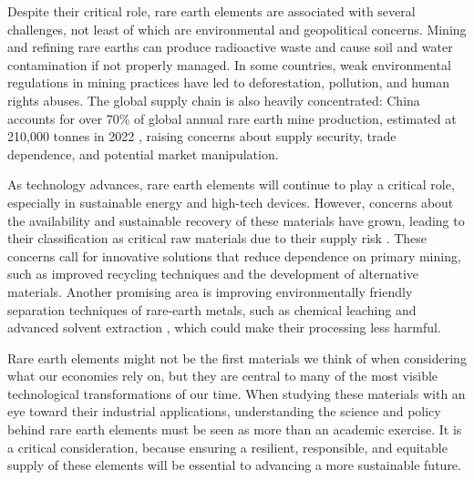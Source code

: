 \documentclass[letterpaper,10pt]{article}
\begin{document}
\newline  
\par
Despite their critical role, rare earth elements are associated with several challenges, not least of which are environmental and geopolitical concerns. Mining and refining rare earths can produce radioactive waste and cause soil and water contamination if not properly managed. In some countries, weak environmental regulations in mining practices have led to deforestation, pollution, and human rights abuses. The global supply chain is also heavily concentrated: China accounts for over 70\% of global annual rare earth mine production, estimated at 210,000 tonnes in 2022 \cite{NaturalResourcesCanada2022}, raising concerns about supply security, trade dependence, and potential market manipulation.

As technology advances, rare earth elements will continue to play a critical role, especially in sustainable energy and high-tech devices. However, concerns about the availability and sustainable recovery of these materials have grown, leading to their classification as critical raw materials due to their supply risk \cite{european_commission_critical_2023}. These concerns call for innovative solutions that reduce dependence on primary mining, such as improved recycling techniques and the development of alternative materials. Another promising area is improving environmentally friendly separation techniques of rare-earth metals, such as chemical leaching \cite{Peelman2016} and advanced solvent extraction \cite{zhang2023}, which could make their processing less harmful.
\newline  
\par
Rare earth elements might not be the first materials we think of when considering what our economies rely on, but they are central to many of the most visible technological transformations of our time. When studying these materials with an eye toward their industrial applications, understanding the science and policy behind rare earth elements must be seen as more than an academic exercise. It is a critical consideration, because ensuring a resilient, responsible, and equitable supply of these elements will be essential to advancing a more sustainable future.
\printbibliography
\end{document}
